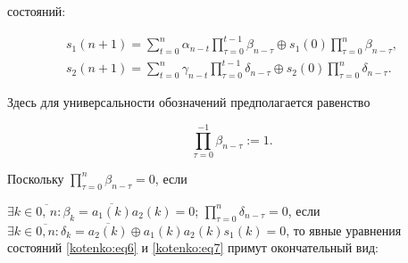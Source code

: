 состояний:

\begin{gather}

\label{kotenko:eq6}

s_1 (n+1)=\sum\limits_{t=0}^n \alpha _{n-t} \prod\limits_{\tau =0}^{t-1} \beta _{n-\tau}  \oplus s_1 ( 0 )

\prod\limits_{\tau =0}^n \beta _{n-\tau },\\

\label{kotenko:eq7}

s_2 ( n+1 )=\sum\limits_{t=0}^n \gamma_{n-t} \prod \limits_{\tau =0}^{t-1} \delta _{n-\tau}  \oplus s_2 ( 0 )

\prod\limits_{\tau =0}^n \delta _{n-\tau }.

\end{gather}



Здесь для универсальности обозначений предполагается равенство

$$

\prod \limits_{\tau =0}^{-1} \beta_{n-\tau} :=1.

$$



Поскольку $\prod\nolimits_{\tau =0}^n \beta _{n-\tau }  =0$, если

$\exists k \in \overline {0,\,n} : \beta _k =\overline {a_1 ( k )}

a_2 ( k )=0$; $\prod\nolimits_{\tau =0}^n \delta _{n-\tau }  =0$, если $\exists k\in

\overline {0,n}:\delta _k =\overline {a_2 ( k )} \oplus a_1

( k )a_2 ( k )s_1 ( k )=0$, то явные уравнения состояний \eqref{kotenko:eq6} и \eqref{kotenko:eq7} примут окончательный вид:

